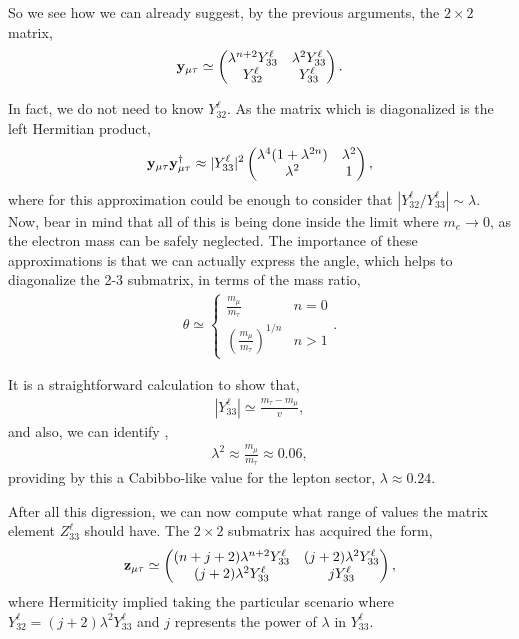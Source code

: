 \documentclass[aps,prd,groupaddress,floatfix,tighten,nofootinbib,showpacs,
amsfonts,superscriptaddress]{revtex4}
\begin{document}
So we see how we can already suggest, by the previous arguments, the $2\times 2$ matrix,
\begin{eqnarray}
	{\bf y}_{\mu \tau} \simeq \begin{pmatrix}
		\lambda^{n+2} Y_{33}^\ell  & \lambda^2 Y_{33}^\ell \\
			Y_{32}^\ell & Y_{33}^\ell
	\end{pmatrix}.
\end{eqnarray}

In fact, we do not need to know $Y_{32}^\ell$. As the matrix which is diagonalized is the left Hermitian product, 
\begin{eqnarray}
	{\bf y}_{\mu \tau} {\bf y}_{\mu \tau}^\dagger \approx |Y_{33}^\ell |^2
	\begin{pmatrix}
			\lambda^4(1 + \lambda^{2n}) & \lambda^2 \\
			\lambda^2 & 1	
	\end{pmatrix},
\end{eqnarray}
where for this approximation could be enough to consider that $|Y^\ell_{32}/Y_{33}^\ell | \sim \lambda$.
Now, bear in mind that all of this is being done inside the limit where $m_e \rightarrow 0 $, 
as the electron mass can be safely neglected. The importance of these approximations is that we can actually express the angle,
which helps to diagonalize the 2-3 submatrix, in
terms of the mass ratio,
\begin{eqnarray}
	\theta \simeq \begin{cases}
	\frac{m_\mu}{m_\tau} & n = 0 \\
	 (\frac{m_\mu}{m_\tau})^{1/n} & n > 1
	 \end{cases}.
\end{eqnarray}

It is a straightforward calculation to show that,
\begin{eqnarray}
	|Y_{33}^\ell | \simeq \frac{m_\tau - m_\mu}{v},
\end{eqnarray} 
and also, we can identify \cite{Ibarra:2003xp},
\begin{eqnarray}
	\lambda^2 \approx \frac{m_\mu}{m_\tau} \approx 0.06,
\end{eqnarray}
providing by this a Cabibbo-like value for the lepton sector, $\lambda \approx 0.24$.


After all this digression, we can now compute what range of values the matrix element $Z_{33}^\ell$ should have. The $2\times 2$ submatrix has acquired the form,
\begin{eqnarray}
	{\bf z}_{\mu \tau} \simeq \begin{pmatrix}
		(n+j+2) \lambda^{n+2} Y_{33}^\ell  & (j+2) \lambda^2 Y_{33}^\ell \\
			(j+2) \lambda^2 Y_{33}^\ell & j Y_{33}^\ell
	\end{pmatrix},
\end{eqnarray}
where Hermiticity implied taking the particular scenario where $Y_{32}^\ell = (j+2) \lambda^2 Y_{33}^\ell$ and $j$ represents the power of $\lambda$ in $Y_{33}^\ell$. 
\end{document}
